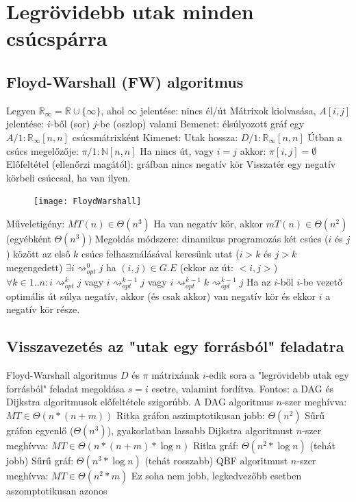 \documentclass[12pt,a4paper]{article}
\renewcommand{\leadsto}{\rightsquigarrow}
\begin{document}
\section{Legrövidebb utak minden csúcspárra}

\subsection{Floyd-Warshall (FW) algoritmus}

\begin{outline}
	\1 Legyen $\mathbb{R}_\infty = \mathbb{R} \cup \{\infty\}$, ahol $\infty$ jelentése: nincs él/út
	\1 Mátrixok kiolvasása, $A[i,j]$ jelentése: $i$-ből (sor) $j$-be (oszlop) valami
	\1 Bemenet: élsúlyozott gráf egy $A/1: \mathbb{R}_\infty[n,n]$ csúcsmátrixként
	\1 Kimenet:
		\2 Utak hossza: $D/1: \mathbb{R}_\infty[n,n]$
		\2 Útban a csúcs megelőzője: $\pi/1: \mathbb{N}[n,n]$
			\3 Ha nincs út, vagy $i=j$ akkor: $\pi[i,j]=\emptyset$
	\1 Előfeltétel (ellenőrzi magától): gráfban nincs negatív kör
		\2 Visszatér egy negatív körbeli csúccsal, ha van ilyen.
\end{outline}

\begin{figure}[h!]
	\centering
	\texttt{[image: FloydWarshall]}
\end{figure}

\begin{outline}
	\1 Műveletigény: $MT(n) \in \Theta(n^3)$
		\2 Ha van negatív kör, akkor $mT(n) \in \Theta(n^2)$ \; (egyébként $\Theta(n^3)$)
\pagebreak
	\1 Megoldás módszere: dinamikus programozás
		\2 két csúcs ($i$ és $j$) között az első $k$ csúcs felhasználásával keresünk utat
		($i > k$ és $j > k$ megengedett)
		\2 $\exists i \leadsto^0_{opt} j$ ha $(i,j) \in G.E$ \;\; (ekkor az út: $<i,j>$)
		\2 $\forall k \in 1..n: i \leadsto^{k}_{opt} j$ vagy $i \leadsto^{k-1}_{opt} j$
		vagy $i \leadsto^{k-1}_{opt} k \leadsto^{k-1}_{opt} j$
		\2 Ha az $i$-ből $i$-be vezető optimális út súlya negatív, akkor (és csak akkor) van negatív kör és ekkor $i$ a negatív kör része.
\end{outline}

\subsection{Visszavezetés az "utak egy forrásból" feladatra}

\begin{outline}
	\1 Floyd-Warshall algoritmus $D$ és $\pi$ mátrixának $i$-edik sora a "legrövidebb utak egy forrásból" feladat megoldása $s=i$ esetre, valamint fordítva.
	\1 Fontos: a DAG és Dijkstra algoritmusok előfeltétele szigorúbb.
	\1 A DAG algoritmus $n$-szer meghívva: $MT \in \Theta(n*(n+m))$
		\2 Ritka gráfon aszimptotikusan jobb: $\Theta(n^2)$
		\2 Sűrű gráfon egyenlő ($\Theta(n^3)$), gyakorlatban lassabb
	\1 Dijkstra algoritmust $n$-szer meghívva: $MT \in \Theta(n*(n+m)*\log n)$
		\2 Ritka gráf: $\Theta(n^2*\log n)$ (tehát jobb)
		\2 Sűrű gráf: $\Theta(n^3*\log n)$ (tehát rosszabb)
	\1 QBF algoritmust $n$-szer meghívva: $MT \in \Theta(n^2*m)$
		\2 Ez soha nem jobb, legkedvezőbb esetben aszomptotikusan azonos
\end{outline}
\end{document}
